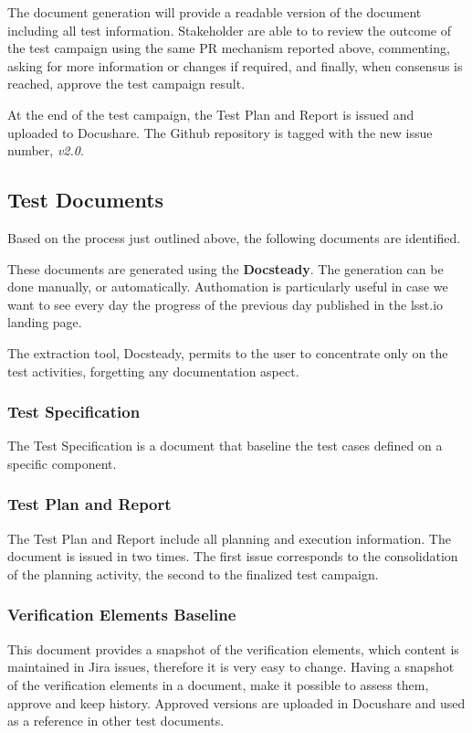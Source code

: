 The document generation will provide a readable version of the document including all test information.
Stakeholder are able to to review the outcome of the test campaign using the same PR mechanism reported above, 
commenting, asking for more information or changes if required, and finally, when consensus is reached, approve the test campaign result.

At the end of the test campaign, the Test Plan and Report is issued and uploaded to Docushare.
The Github repository is tagged with the new issue number, \textit{v2.0}.


\subsection{Test Documents}

Based on the process just outlined above, the following documents are identified.

These documents are generated using the \textbf{Docsteady}.
The generation can be done manually, or automatically.
Authomation is particularly useful in case we want to see every day the progress of the previous day published in the lsst.io landing page.

The extraction tool, Docsteady, permits to the user to concentrate only on the test activities,
forgetting any documentation aspect.


\subsubsection{Test Specification}

The Test Specification is a document that baseline the test cases defined on a specific component.


\subsubsection{Test Plan and Report}

The Test Plan and Report include all planning and execution information. 
The document  is issued in two times. The first issue corresponds to the consolidation of the planning activity, 
the second to the finalized test campaign.


\subsubsection{Verification Elements Baseline}

This document provides a snapshot of the verification elements, which content is maintained in Jira issues, therefore it is very easy to change.
Having a snapshot of the verification elements in a document, make it possible to assess them, approve and keep history.
Approved versions are uploaded in Docushare and used as a reference in other test documents.


